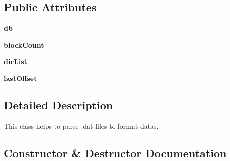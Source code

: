 \subsection*{Public Attributes}
\begin{DoxyCompactItemize}
\item 
\hypertarget{classblockparser_1_1BlockParser_1_1BlockParser_a9e051ac4f0be4e182c7cfc9eebde2288}{}{\bfseries db}\label{classblockparser_1_1BlockParser_1_1BlockParser_a9e051ac4f0be4e182c7cfc9eebde2288}

\item 
\hypertarget{classblockparser_1_1BlockParser_1_1BlockParser_a20ceab64db60efb26ea5cfc1ea59c1d5}{}{\bfseries block\+Count}\label{classblockparser_1_1BlockParser_1_1BlockParser_a20ceab64db60efb26ea5cfc1ea59c1d5}

\item 
\hypertarget{classblockparser_1_1BlockParser_1_1BlockParser_ac4025a29f560709060b9a397ec11f1b2}{}{\bfseries dir\+List}\label{classblockparser_1_1BlockParser_1_1BlockParser_ac4025a29f560709060b9a397ec11f1b2}

\item 
\hypertarget{classblockparser_1_1BlockParser_1_1BlockParser_a4c572fa102bdaa1b2b6d23120ebc5965}{}{\bfseries last\+Offset}\label{classblockparser_1_1BlockParser_1_1BlockParser_a4c572fa102bdaa1b2b6d23120ebc5965}

\end{DoxyCompactItemize}


\subsection{Detailed Description}
\begin{DoxyVerb}This class helps to parse .dat files to format datas.\end{DoxyVerb}
 

\subsection{Constructor \& Destructor Documentation}
\hypertarget{classblockparser_1_1BlockParser_1_1BlockParser_ad1094fe979d35e4eff2380b404909a92}{}
